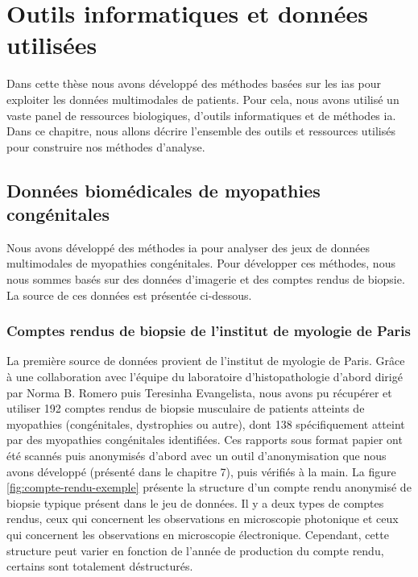 \chapter{Outils informatiques et données utilisées}

Dans cette thèse nous avons développé des méthodes basées sur les \gls{ia}s pour exploiter les données multimodales de patients. Pour cela, nous avons utilisé un vaste panel de ressources biologiques, d'outils informatiques et de méthodes \gls{ia}. Dans ce chapitre, nous allons décrire l'ensemble des outils et ressources utilisés pour construire nos méthodes d'analyse.

\section{Données biomédicales de myopathies congénitales}
Nous avons développé des méthodes \gls{ia} pour analyser des jeux de données multimodales de myopathies congénitales. Pour développer ces méthodes, nous nous sommes basés sur des données d'imagerie et des comptes rendus de biopsie. La source de ces données est présentée ci-dessous.

\subsection{Comptes rendus de biopsie de l'institut de myologie de Paris}
La première source de données provient de l'institut de myologie de Paris. Grâce à une collaboration avec l'équipe du laboratoire d’histopathologie d'abord dirigé par Norma B. Romero puis Teresinha Evangelista, nous avons pu récupérer et utiliser 192 comptes rendus de biopsie musculaire de patients atteints de myopathies (congénitales, dystrophies ou autre), dont 138 spécifiquement atteint par des myopathies congénitales identifiées. Ces rapports sous format papier ont été scannés puis anonymisés d'abord avec un outil d'anonymisation que nous avons développé (présenté dans le chapitre 7), puis vérifiés à la main. La figure \ref{fig:compte-rendu-exemple} présente la structure d'un compte rendu anonymisé de biopsie typique présent dans le jeu de données. Il y a deux types de comptes rendus, ceux qui concernent les observations en microscopie photonique et ceux qui concernent les observations en microscopie électronique. Cependant, cette structure peut varier en fonction de l'année de production du compte rendu, certains sont totalement déstructurés.

